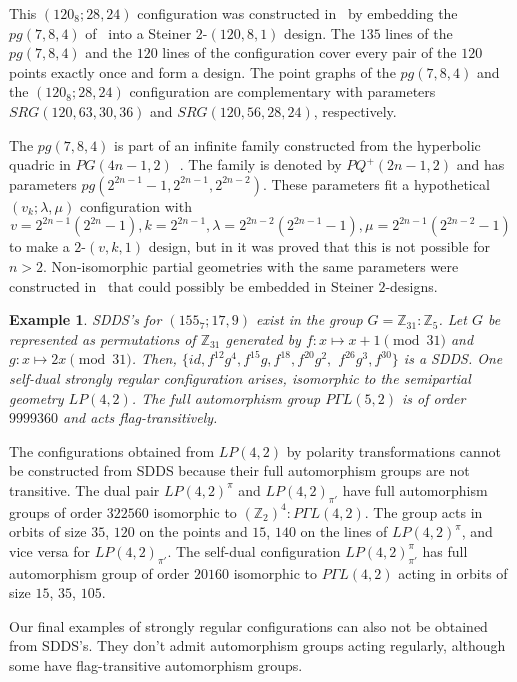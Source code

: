 \documentclass[12pt, reqno]{amsart}
\newtheorem{example}[theorem]{Example}
\def\Z{\mathbb{Z}}
\begin{document}
This $(120_8;28,24)$ configuration was constructed in~\cite{BHT97}
by embedding the $pg(7,8,4)$ of~\cite{DDT80, AMC81} into a Steiner $2$-$(120,8,1)$
design. The $135$ lines of the $pg(7,8,4)$ and the $120$ lines
of the configuration cover every pair of the $120$ points exactly once
and form a design. The point graphs of the $pg(7,8,4)$ and the $(120_8;28,24)$
configuration are complementary with parameters $SRG(120,63,30,36)$ and
$SRG(120,56,28,24)$, respectively.

The $pg(7,8,4)$ is part of an infinite family constructed from
the hyperbolic quadric in $PG(4n-1,2)$~\cite{DDT80}. The family is
denoted by $PQ^+(2n-1,2)$ and has parameters $pg(2^{2n-1}-1,2^{2n-1},2^{2n-2})$.
These parameters fit a hypothetical $(v_k;\lambda,\mu)$ configuration with
$$v=2^{2n-1}(2^{2n}-1), k=2^{2n-1}, \lambda=2^{2n-2}(2^{2n-1}-1),
\mu=2^{2n-1}(2^{2n-2}-1)$$
to make a $2$-$(v,k,1)$ design, but in \cite[Theorem 2.1]{BHT97}
it was proved that this is not possible for $n>2$. Non-isomorphic partial
geometries with the same parameters were constructed in~\cite{MS97, DD00}
that could possibly be embedded in Steiner $2$-designs.

\begin{example}\label{pg42}
SDDS's for $(155_7;17,9)$ exist in the group $G=\Z_{31}:\Z_5$. Let $G$
be represented as permutations of $\Z_{31}$ generated by $f:x\mapsto
x+1 \pmod{31}$ and $g:x\mapsto 2x \pmod{31}$. Then, $\{id,f^{12}g^4,
f^{15}g, f^{18}, f^{20}g^2,$ $f^{26}g^3, f^{30}\}$ is a SDDS. One
self-dual strongly regular configuration arises, isomorphic to the
semipartial geometry $LP(4,2)$. The full automorphism group $P\Gamma L(5,2)$
is of order $9999360$ and acts flag-transitively.
\end{example}

The configurations obtained from $LP(4,2)$ by polarity transformations
cannot be constructed from SDDS because their full automorphism groups are
not transitive. The dual pair $LP(4,2)^\pi$ and $LP(4,2)_{\pi'}$ have
full automorphism groups of order $322560$ isomorphic to $(\Z_2)^4:P\Gamma L(4,2)$.
The group acts in orbits of size $35$, $120$ on the points and $15$, $140$ on the lines
of $LP(4,2)^\pi$, and vice versa for $LP(4,2)_{\pi'}$.
The self-dual configuration $LP(4,2)^{\pi}_{\pi'}$ has full automorphism group
of order $20160$ isomorphic to $P\Gamma L(4,2)$ acting in orbits of size $15$, $35$, $105$.

Our final examples of strongly regular configurations can
also not be obtained from SDDS's. They don't admit automorphism
groups acting regularly, although some have flag-transitive
automorphism groups.
\end{document}
